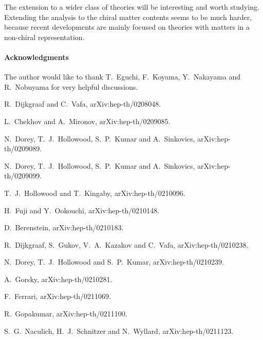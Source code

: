 \documentclass[a4paper,12pt]{article}
\begin{document}
The extension to a wider class of theories 
will be interesting and worth studying.
Extending the analysis to the chiral matter contents seems to be much harder,
because recent developments are mainly focused on theories with
matters in a non-chiral  representation.


\paragraph{Acknowledgments}
The author would like to thank T.~Eguchi, 
F.~Koyama,  Y.~Naka\-yama and R.~Nobuyama for  very helpful discussions.


\begin{thebibliography}{99}



R.~Dijkgraaf and C.~Vafa,
arXiv:hep-th/0208048.


L.~Chekhov and A.~Mironov,
arXiv:hep-th/0209085.

N.~Dorey, T.~J.~Hollowood, S.~P.~Kumar and A.~Sinkovics,
arXiv:hep-th/0209089.

N.~Dorey, T.~J.~Hollowood, S.~P.~Kumar and A.~Sinkovics,
arXiv:hep-th/0209099.




T.~J.~Hollowood and T.~Kingaby,
arXiv:hep-th/0210096.

H.~Fuji and Y.~Ookouchi,
arXiv:hep-th/0210148.

D.~Berenstein,
arXiv:hep-th/0210183.



R.~Dijkgraaf, S.~Gukov, V.~A.~Kazakov and C.~Vafa,
arXiv:hep-th/0210238.

N.~Dorey, T.~J.~Hollowood and S.~P.~Kumar,
arXiv:hep-th/0210239.

A.~Gorsky,
arXiv:hep-th/0210281.





F.~Ferrari,
arXiv:hep-th/0211069.




R.~Gopakumar,
arXiv:hep-th/0211100.

S.~G.~Naculich, H.~J.~Schnitzer and N.~Wyllard,
arXiv:hep-th/0211123.




\end{thebibliography}
\end{document}
